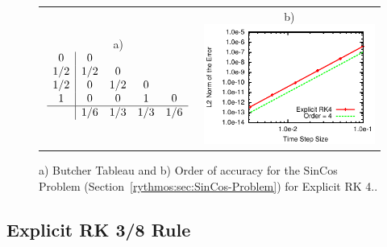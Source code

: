 \begin{figure}[H]
\centering{}%
\begin{tabular}{cc}
a)$\begin{array}{c|cccc}
0 & 0\\
1/2 & 1/2 & 0\\
1/2 & 0 & 1/2 & 0\\
1 & 0 & 0 & 1 & 0\\
\hline  & 1/6 & 1/3 & 1/3 & 1/6
\end{array}$ & b)\includegraphics[scale=1.5]{figures/ERK_4Stage}\tabularnewline
\end{tabular}\caption{a) Butcher Tableau and b) Order of accuracy for the SinCos Problem
(Section~\ref{rythmos:sec:SinCos-Problem}) for Explicit RK 4.\label{rythmos:tab:ButcherTableau-ERK_4Stage}.}
\end{figure}



\subsection{Explicit RK 3/8 Rule}

